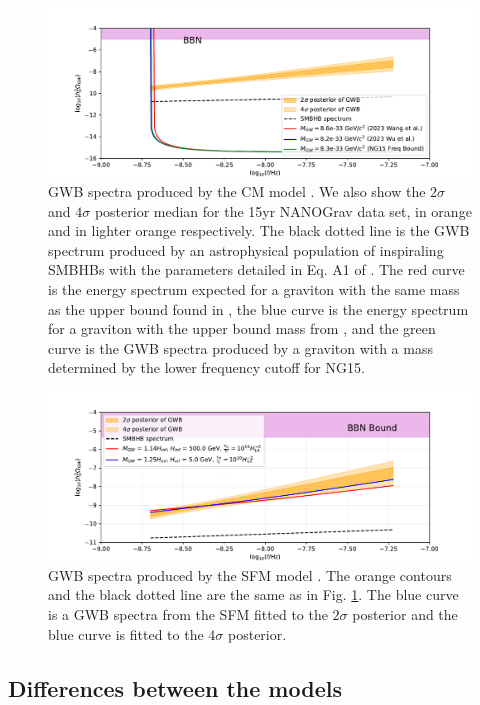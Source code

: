 \begin{figure}
\includegraphics[width=\textwidth]{fig/fig1.pdf}
\caption{
GWB spectra produced by the CM model \cite{Gumrukcuoglu:2012}. We also show the $2\sigma$ and $4\sigma$ posterior median for the 15yr NANOGrav data set, in orange and in lighter orange respectively. The black dotted line is the GWB spectrum produced by an astrophysical population of inspiraling SMBHBs with the parameters detailed in Eq. A1 of \cite{Afzal:2023}. The red curve is the energy spectrum expected for a graviton with the same mass as the upper bound found in \cite{Wang:2023}, the blue curve is the energy spectrum for a graviton with the upper bound mass from \cite{Wu:2023}, and the green curve is the GWB spectra produced by a graviton with a mass determined by the lower frequency cutoff for NG15.}\label{fig:GWB_CM}
\end{figure}

\begin{figure}
\includegraphics[width=\textwidth]{fig/fig3.pdf}
\caption{
GWB spectra produced by the SFM model \cite{Fujita:2018}. The orange contours and the black dotted line are the same as in Fig. \ref{fig:GWB_CM}. The blue curve is a GWB spectra from the SFM fitted to the $2\sigma$ posterior and the blue curve is fitted to the $4\sigma$ posterior. }\label{fig:GWB_SFM}
\end{figure}


\subsection{Differences between the models}

